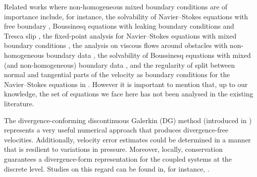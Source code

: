 \documentclass[onefignum,onetabnum,reqno,a4paper,final]{siamart250211}
\newcommand\0{\mathbf{0}}
\numberwithin{figure}{section}
\numberwithin{table}{section}
\begin{document}
Related works where non-homogeneous mixed boundary conditions are of importance include, for instance, the solvability of Navier--Stokes equations with free boundary \cite{le1993steady}, Boussinesq equations with leaking boundary conditions and Tresca slip \cite{kim2022steady}, the fixed-point analysis for Navier--Stokes equations with mixed boundary conditions \cite{manzoni2019saddle},   the analysis on viscous flows around obstacles with non-homogeneous boundary data \cite{ingram2011finite}, the solvability of Boussinesq equations with mixed (and non-homogeneous) boundary data \cite{arndt2020existence,ceretani2019boussinesq}, and the regularity of split between normal and tangential parts of the velocity as boundary conditions for the Navier--Stokes equations in \cite{ebmeyer2001steady}. 
	However it is important to mention that, up to our knowledge, the set of equations we face here has not been analysed in the existing literature. 


The divergence-conforming discontinuous Galerkin (DG) method (introduced in \cite{cockburn2007note}) represents a very useful numerical approach that produces divergence-free velocities.  Additionally, velocity error estimates could be determined in a manner that is resilient to variations in pressure. Moreover, locally, conservation guarantees a divergence-form representation for the coupled systems at the discrete level.  Studies on this regard can be found in, for instance, \cite{badia24,buerger2019h,schroeder2017stabilised,john2017divergence}. 
     
\end{document}
